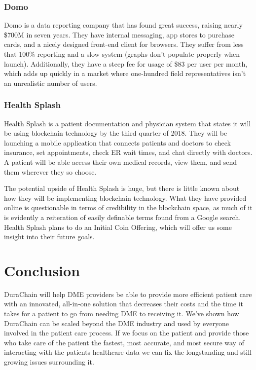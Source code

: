 \documentclass[preprint,pre,floats,aps,amsmath,amssymb]{revtex4-1}
\begin{document}
  \subsubsection{Domo}
  Domo is a data reporting company that has found great success, raising nearly \$700M in seven years. They have internal messaging, app stores to purchase cards, and a nicely designed front-end client for browsers. They suffer from less that 100\% reporting and a slow system (graphs don’t populate properly when launch). Additionally, they have a steep fee for usage of \$83 per user per month, which adds up quickly in a market where one-hundred field representatives isn’t an unrealistic number of users.

  \subsubsection{Health Splash}
  Health Splash is a patient documentation and physician system that states it will be using blockchain technology by the third quarter of 2018. They will be launching a mobile application that connects patients and doctors to check insurance, set appointments, check ER wait times, and chat directly with doctors. A patient will be able access their own medical records, view them, and send them wherever they so choose.

  The potential upside of Health Splash is huge, but there is little known about how they will be implementing blockchain technology. What they have provided online is questionable in terms of credibility in the blockchain space, as much of it is evidently a reiteration of easily definable terms found from a Google search. Health Splash plans to do an Initial Coin Offering, which will offer us some insight into their future goals.

\section{Conclusion}
DuraChain will help DME providers be able to provide more efficient patient care with an innovated, all-in-one solution that decreases their costs and the time it takes for a patient to go from needing DME to receiving it. We’ve shown how DuraChain can be scaled beyond the DME industry and used by everyone involved in the patient care process. If we focus on the patient and provide those who take care of the patient the fastest, most accurate, and most secure way of interacting with the patients healthcare data we can fix the longstanding and still growing issues surrounding it.
\end{document}
